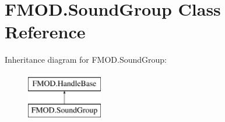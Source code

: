 \hypertarget{class_f_m_o_d_1_1_sound_group}{}\section{F\+M\+O\+D.\+Sound\+Group Class Reference}
\label{class_f_m_o_d_1_1_sound_group}
Inheritance diagram for F\+M\+O\+D.\+Sound\+Group\+:\begin{figure}[H]
\begin{center}
\leavevmode
\includegraphics[height=2.000000cm]{class_f_m_o_d_1_1_sound_group}
\end{center}
\end{figure}
